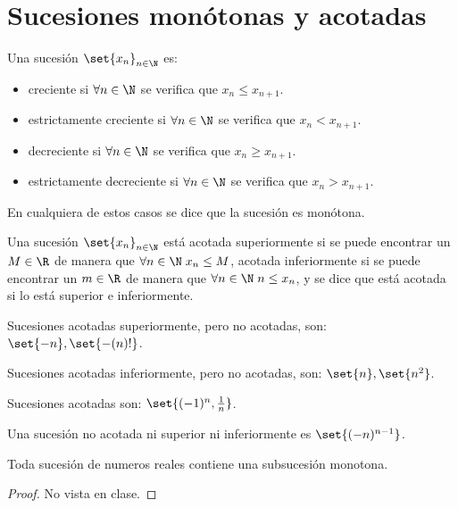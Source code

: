 \section{Sucesiones monótonas y acotadas}
\begin{definition}
	Una sucesión \(\set{x_n}_{n \in \N }\) es:
	\begin{itemize}
		\item creciente si \(\forall n \in \N \) se verifica que \(x_n \leq x_{n+1 }\).
		\item estrictamente creciente si \(\forall  n \in \N \) se verifica que \(x_n < x_{n+1}\).
		\item decreciente si \(\forall n \in \N \) se verifica que \(x_n \geq x_{n+1 }\).
		\item estrictamente decreciente si \(\forall n \in \N \) se verifica que \(x_n > x_{n+1}\).
	\end{itemize}
	En cualquiera de estos casos se dice que la sucesión es monótona.
\end{definition}

\begin{definition}
	Una sucesión \(\set{x_n}_{n \in \N }\) está acotada superiormente si se puede encontrar un \(M \in \R \) de manera que \(\forall n \in \N \; x_n \leq M \), acotada inferiormente si se puede encontrar un \(m \in \R \) de manera que \(\forall n \in \N \; n \leq x_n \), y se dice que está acotada si lo está superior e inferiormente.
\end{definition}
\begin{example}
	Sucesiones acotadas superiormente, pero no acotadas, son: \(\set{-n}, \set{-(n)! }\).

	Sucesiones acotadas inferiormente, pero no acotadas, son: \(\set{n}, \set{n^{2}}\).

	Sucesiones acotadas son: \(\set{(-1)^{n}, \frac{1}{n }}\).

	Una sucesión no acotada ni superior ni inferiormente es \(\set{(-n)^{n-1}}\).
\end{example}
\begin{theorem}
	\label{submon}
	Toda sucesión de numeros reales contiene una subsucesión monotona.
\end{theorem}
\begin{proof}
	No vista en clase.
\end{proof}

